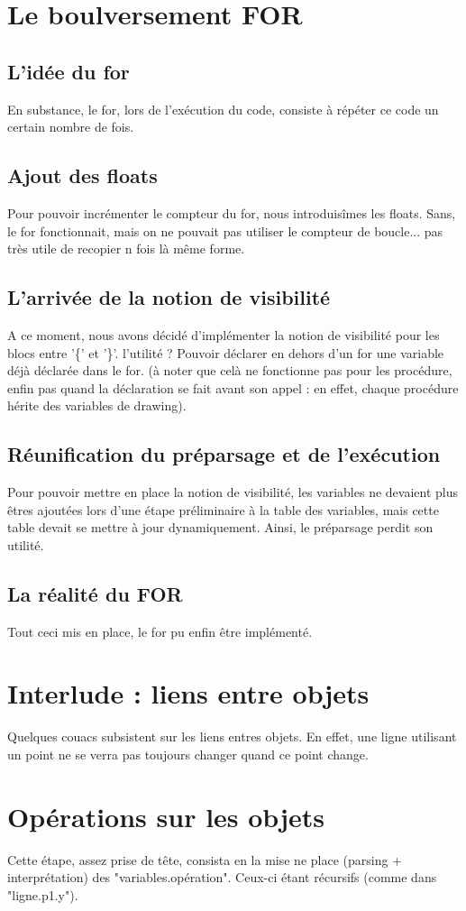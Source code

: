 \documentclass[11pt]{report} %
\begin{document}
\section{Le boulversement FOR}
\subsection{L'idée du for}
En substance, le for, lors de l'exécution du code, consiste à répéter ce code un certain nombre de fois.
\subsection{Ajout des floats}
Pour pouvoir incrémenter le compteur du for, nous introduisîmes les floats. Sans, le for fonctionnait, mais on ne pouvait pas utiliser le compteur de boucle... pas très utile de recopier n fois là même forme.
\subsection{L'arrivée de la notion de visibilité}
A ce moment, nous avons décidé d'implémenter la notion de visibilité pour les blocs entre '\{' et '\}'. l'utilité ? Pouvoir déclarer en dehors d'un for une variable déjà déclarée dans le for. (à noter que celà ne fonctionne pas pour les procédure, enfin pas quand la déclaration se fait avant son appel : en effet, chaque procédure hérite des variables de drawing).
\subsection{Réunification du préparsage et de l'exécution}
Pour pouvoir mettre en place la notion de visibilité, les variables ne devaient plus êtres ajoutées lors d'une étape préliminaire à la table des variables, mais cette table devait se mettre à jour dynamiquement. Ainsi, le préparsage perdit son utilité.
\subsection{La réalité du FOR}
Tout ceci mis en place, le for pu enfin être implémenté.

\section{Interlude : liens entre objets}
Quelques couacs subsistent sur les liens entres objets. En effet, une ligne utilisant un point ne se verra pas toujours changer quand ce point change.
\section{Opérations sur les objets}
Cette étape, assez prise de tête, consista en la mise ne place (parsing + interprétation) des "variables.opération". Ceux-ci étant récursifs (comme dans "ligne.p1.y").
\end{document}
